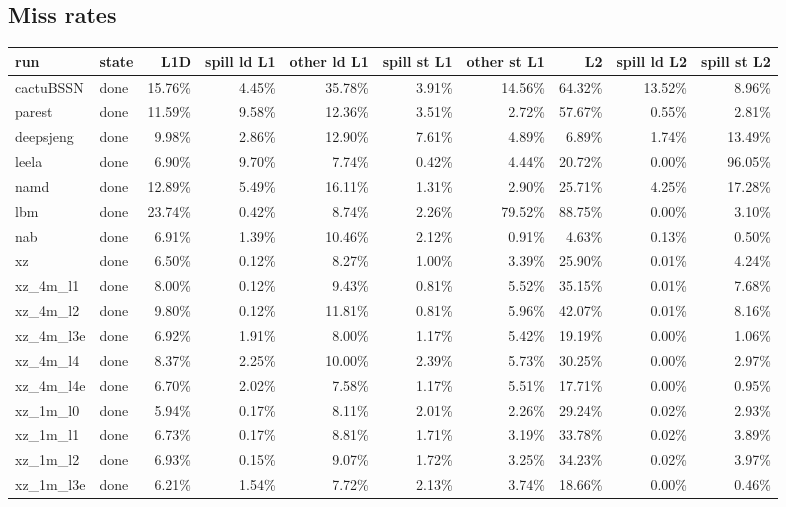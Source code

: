 \documentclass[10pt,a4paper,landscape]{article}
\begin{document}
\subsection*{Miss rates}
{\footnotesize
\begin{longtable}{llrrrrrrrr}
\toprule
run & state & L1D & spill ld L1 & other ld L1 & spill st L1 & other st L1 & L2 & spill ld L2 & spill st L2 \\
\midrule
\endhead
\bottomrule
\endfoot
cactuBSSN & done & 15.76\% & 4.45\% & 35.78\% & 3.91\% & 14.56\% & 64.32\% & 13.52\% & 8.96\% \\
parest & done & 11.59\% & 9.58\% & 12.36\% & 3.51\% & 2.72\% & 57.67\% & 0.55\% & 2.81\% \\
deepsjeng & done & 9.98\% & 2.86\% & 12.90\% & 7.61\% & 4.89\% & 6.89\% & 1.74\% & 13.49\% \\
leela & done & 6.90\% & 9.70\% & 7.74\% & 0.42\% & 4.44\% & 20.72\% & 0.00\% & 96.05\% \\
namd & done & 12.89\% & 5.49\% & 16.11\% & 1.31\% & 2.90\% & 25.71\% & 4.25\% & 17.28\% \\
lbm & done & 23.74\% & 0.42\% & 8.74\% & 2.26\% & 79.52\% & 88.75\% & 0.00\% & 3.10\% \\
nab & done & 6.91\% & 1.39\% & 10.46\% & 2.12\% & 0.91\% & 4.63\% & 0.13\% & 0.50\% \\
xz & done & 6.50\% & 0.12\% & 8.27\% & 1.00\% & 3.39\% & 25.90\% & 0.01\% & 4.24\% \\
xz\_4m\_l1 & done & 8.00\% & 0.12\% & 9.43\% & 0.81\% & 5.52\% & 35.15\% & 0.01\% & 7.68\% \\
xz\_4m\_l2 & done & 9.80\% & 0.12\% & 11.81\% & 0.81\% & 5.96\% & 42.07\% & 0.01\% & 8.16\% \\
xz\_4m\_l3e & done & 6.92\% & 1.91\% & 8.00\% & 1.17\% & 5.42\% & 19.19\% & 0.00\% & 1.06\% \\
xz\_4m\_l4 & done & 8.37\% & 2.25\% & 10.00\% & 2.39\% & 5.73\% & 30.25\% & 0.00\% & 2.97\% \\
xz\_4m\_l4e & done & 6.70\% & 2.02\% & 7.58\% & 1.17\% & 5.51\% & 17.71\% & 0.00\% & 0.95\% \\
xz\_1m\_l0 & done & 5.94\% & 0.17\% & 8.11\% & 2.01\% & 2.26\% & 29.24\% & 0.02\% & 2.93\% \\
xz\_1m\_l1 & done & 6.73\% & 0.17\% & 8.81\% & 1.71\% & 3.19\% & 33.78\% & 0.02\% & 3.89\% \\
xz\_1m\_l2 & done & 6.93\% & 0.15\% & 9.07\% & 1.72\% & 3.25\% & 34.23\% & 0.02\% & 3.97\% \\
xz\_1m\_l3e & done & 6.21\% & 1.54\% & 7.72\% & 2.13\% & 3.74\% & 18.66\% & 0.00\% & 0.46\% \\

\end{longtable}}
\end{document}
